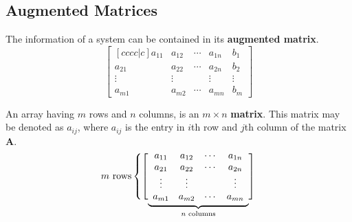 \documentclass{article}
\begin{document}
\subsection{Augmented Matrices}
\begin{definition}
    The information of a system can be contained in its
    \textbf{augmented matrix}.
    \begin{equation*}
        \begin{bmatrix}[cccc|c]
            a_{11} & a_{12} & \cdots & a_{1n} & b_1    \\
            a_{21} & a_{22} & \cdots & a_{2n} & b_2    \\
            \vdots & \vdots &        & \vdots & \vdots \\
            a_{m1} & a_{m2} & \cdots & a_{mn} & b_m
        \end{bmatrix}
    \end{equation*}
\end{definition}
\begin{definition}
    An array having \(m\) rows and \(n\) columns, is an \(m \times n\)
    \textbf{matrix}. This matrix may be denoted as \(a_{ij}\), where
    \(a_{ij}\) is the entry in \(i\)th row and \(j\)th column of the
    matrix \(\symbf{A}\).
    \begin{equation*}
        \text{\(m\) rows}
        \left\{
        \left[
        \vphantom{
            \begin{array}{c} 1 \\ 1 \\ 1 \\ 1
            \end{array}
        }
        \smash{\underbrace{
            \begin{array}{cccc}
                a_{11} & a_{12} & \cdots & a_{1n} \\
                a_{21} & a_{22} & \cdots & a_{2n} \\
                \vdots & \vdots &        & \vdots \\
                a_{m1} & a_{m2} & \cdots & a_{mn}
            \end{array}
        }_{\text{\(n\) columns}}}
        \right]
        \right.
    \end{equation*}
\end{definition}
\end{document}
